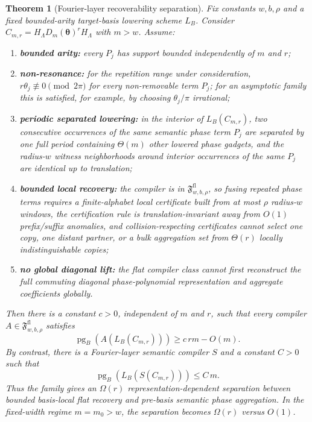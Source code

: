 \documentclass[11pt]{article}
\newtheorem{theorem}{Theorem}
\begin{document}
\begin{theorem}[Fourier-layer recoverability separation]
\label{thm:fourier-layer-separation}
Fix constants $w,b,\rho$ and a fixed bounded-arity target-basis lowering
scheme $L_B$. Consider
$C_{m,r}=H_{\Lambda}D_m(\boldsymbol{\theta})^rH_{\Lambda}$ with $m>w$. Assume:
\begin{enumerate}[leftmargin=1.5em]
    \item \textbf{bounded arity:} every $P_j$ has support bounded independently of $m$ and $r$;
    \item \textbf{non-resonance:} for the repetition range under consideration, $r\theta_j\not\equiv 0 \pmod{2\pi}$ for every non-removable term $P_j$; for an asymptotic family this is satisfied, for example, by choosing $\theta_j/\pi$ irrational;
    \item \textbf{periodic separated lowering:} in the interior of $L_B(C_{m,r})$, two consecutive occurrences of the same semantic phase term $P_j$ are separated by one full period containing $\Theta(m)$ other lowered phase gadgets, and the radius-$w$ witness neighborhoods around interior occurrences of the same $P_j$ are identical up to translation;
    \item \textbf{bounded local recovery:} the compiler is in $\mathfrak{F}^{\mathrm{fl}}_{w,b,\rho}$, so fusing repeated phase terms requires a finite-alphabet local certificate built from at most $\rho$ radius-$w$ windows, the certification rule is translation-invariant away from $O(1)$ prefix/suffix anomalies, and collision-respecting certificates cannot select one copy, one distant partner, or a bulk aggregation set from $\Theta(r)$ locally indistinguishable copies;
    \item \textbf{no global diagonal lift:} the flat compiler class cannot first reconstruct the full commuting diagonal phase-polynomial representation and aggregate coefficients globally.
\end{enumerate}
Then there is a constant $c>0$, independent of $m$ and $r$, such that every
compiler $A\in\mathfrak{F}^{\mathrm{fl}}_{w,b,\rho}$ satisfies
\[
\operatorname{pg}_B(A(L_B(C_{m,r}))) \ge c\,rm - O(m).
\]
By contrast, there is a Fourier-layer semantic compiler $S$ and a constant
$C>0$ such that
\[
\operatorname{pg}_B(L_B(S(C_{m,r}))) \le C\,m.
\]
Thus the family gives an $\Omega(r)$ representation-dependent separation
between bounded basis-local flat recovery and pre-basis semantic phase
aggregation. In the fixed-width regime $m=m_0>w$, the separation becomes
$\Omega(r)$ versus $O(1)$.
\end{theorem}
\end{document}
